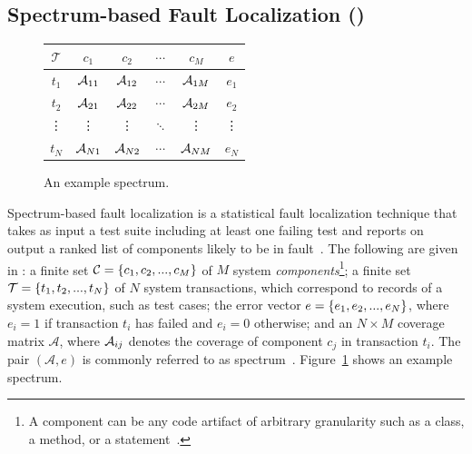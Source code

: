 \documentclass{article}
\begin{document}
\subsection{Spectrum-based Fault Localization (\sfl)}
\label{sec:sfl}

\begin{figure}
  \hspace{-2ex}
  \centering
  \scriptsize
  \setlength{\tabcolsep}{3.5pt}
  \begin{tabular}{c|cccc|c}
    $\mathcal{T}$ & $c_1$    & $c_2$    & $\cdots$ & $c_M$    & $e$    \\ \hline
    $t_1$         & $\mathcal{A}_{11}$ & $\mathcal{A}_{12}$ & $\cdots$ & $\mathcal{A}_{1M}$ & $e_1$  \\
    $t_2$         & $\mathcal{A}_{21}$ & $\mathcal{A}_{22}$ & $\cdots$ & $\mathcal{A}_{2M}$ & $e_2$  \\
    \vdots        & \vdots   & \vdots   & $\ddots$ & \vdots   & \vdots \\
    $t_N$         & $\mathcal{A}_{N1}$ & $\mathcal{A}_{N2}$ & $\cdots$ & $\mathcal{A}_{NM}$ & $e_N$  \\
  \end{tabular}
  \caption{An example spectrum.}
  \label{fig:spectrum-example}
\end{figure}

Spectrum-based fault localization is a statistical fault
localization technique that takes as input a test suite including at
least one failing test and reports on output a ranked list of
components likely to be in
fault~\cite{FLSurvey2016,DBLP:conf/kbse/JonesH05,DBLP:journals/smr/LuciaLJTB14,DBLP:journals/jss/AbreuZGG09}. The
following are given in \sfl{}: a finite set $\mathcal{C}=\{{}c_1,c_2,...,c_M\}$
of $M$ system \emph{components}\footnote{A
component can be any code artifact of arbitrary granularity
such as a class, a method, or a statement~\cite{DBLP:journals/stvr/HarroldRSWY00}.};
a finite set $\mathcal{T} = \{{}t_1,t_2,...,t_N\}$ of $N$ system transactions,
which correspond to records of a system execution, such as test cases;
the error vector $e = \{{}e_1,e_2,...,e_N\}$, where $e_i = 1$ if
transaction $t_i$ has failed and $e_i = 0$ otherwise; and an
$N\times{}M$ coverage matrix $\mathcal{A}$, where $\mathcal{A}_{ij}$ denotes the
coverage of component $c_j$ in transaction $t_i$.  The pair
$(\mathcal{A},e)$ is commonly referred to as
spectrum~\cite{DBLP:journals/stvr/HarroldRSWY00}. Figure~\ref{fig:spectrum-example}
shows an example spectrum.
\end{document}

